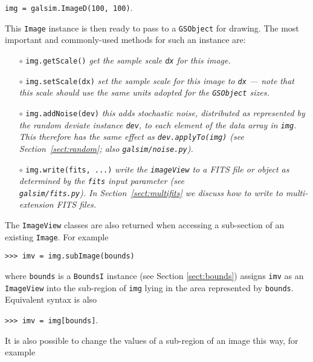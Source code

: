 \documentclass[preprint,11pt]{aastex}
\begin{document}
{\tt img = galsim.ImageD(100, 100)}.

This \texttt{Image} instance is then ready to pass to a
\texttt{GSObject} for drawing.  The most important and commonly-used
methods for such an instance are:
\begin{itemize}

\item[$\circ$] \texttt{img.getScale()} \newline \emph{get the sample
    scale \texttt{dx} for this image.}

\item[$\circ$] \texttt{img.setScale(dx)} \newline \emph{set the sample
    scale for this image to \texttt{dx} --- note that this scale
    should use the same units adopted for the \texttt{GSObject}
    sizes.}

\item[$\circ$] \texttt{img.addNoise(dev)} \newline \emph{this adds
    stochastic noise, distributed as represented by the random deviate
    instance \texttt{dev}, to each element of the data array in
    \texttt{img}.  This therefore has the same effect as
    \texttt{dev.applyTo(img)} (see Section~\ref{sect:random}; also
    \texttt{galsim/noise.py}).}

\item[$\circ$] \texttt{img.write(fits, ...)}  \newline \emph{write the
    \texttt{imageView} to a FITS file or object as determined by the
    \texttt{fits} input parameter
    (see \\
    \texttt{galsim/fits.py}).  In Section~\ref{sect:multifits} we
    discuss how to write to multi-extension FITS files.}

\end{itemize}

The \texttt{ImageView} classes are also returned when accessing a
sub-section of an existing \texttt{Image}.  For example

{\tt >>> imv = img.subImage(bounds)}

where \texttt{bounds} is a \texttt{BoundsI} instance (see Section
\ref{sect:bounds}) assigns \texttt{imv} as an \texttt{ImageView} into
the sub-region of \texttt{img} lying in the area represented by
\texttt{bounds}.  Equivalent syntax is also

{\tt >>> imv = img[bounds]}.

It is also possible to change the values of a sub-region of an image
this way, for example
\end{document}
